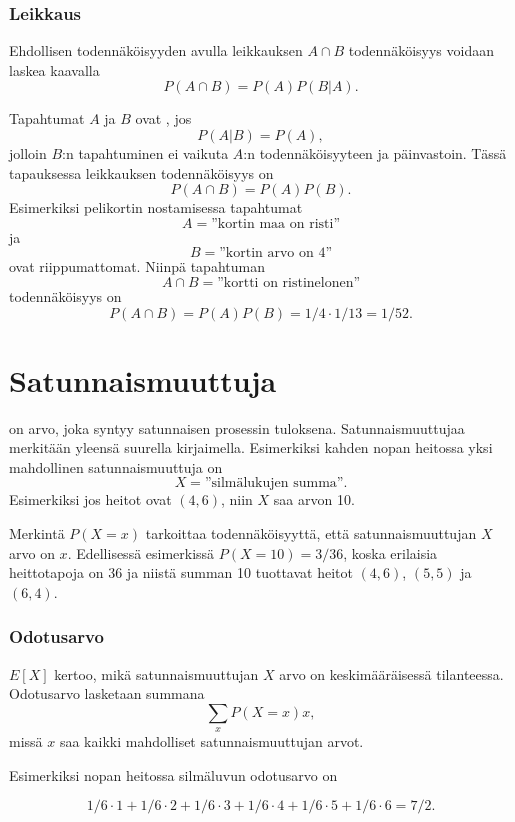 \subsubsection{Leikkaus}


Ehdollisen todennäköisyyden avulla
leikkauksen $A \cap B$ todennäköisyys
voidaan laskea kaavalla
\[P(A \cap B)=P(A)P(B|A).\]

Tapahtumat $A$ ja $B$ ovat , jos
\[P(A|B)=P(A),\]
jolloin $B$:n tapahtuminen ei vaikuta $A$:n
todennäköisyyteen ja päinvastoin.
Tässä tapauksessa leikkauksen
todennäköisyys on
\[P(A \cap B)=P(A)P(B).\]
Esimerkiksi pelikortin nostamisessa
tapahtumat
\[A = \textrm{''kortin maa on risti''}\]
ja
\[B = \textrm{''kortin arvo on 4''}\]
ovat riippumattomat.
Niinpä tapahtuman
\[A \cap B = \textrm{''kortti on ristinelonen''}\]
todennäköisyys on
\[P(A \cap B)=P(A)P(B)=1/4 \cdot 1/13 = 1/52.\]

\section{Satunnaismuuttuja}


 on arvo, joka syntyy satunnaisen
prosessin tuloksena.
Satunnaismuuttujaa merkitään yleensä
suurella kirjaimella.
Esimerkiksi kahden nopan heitossa yksi mahdollinen
satunnaismuuttuja on
\[X=\textrm{''silmälukujen summa''}.\]
Esimerkiksi jos heitot ovat $(4,6)$,
niin $X$ saa arvon 10.

Merkintä $P(X=x)$ tarkoittaa todennäköisyyttä,
että satunnaismuuttujan $X$ arvo on $x$.
Edellisessä esimerkissä $P(X=10)=3/36$,
koska erilaisia heittotapoja on 36
ja niistä summan 10 tuottavat heitot
$(4,6)$, $(5,5)$ ja $(6,4)$.

\subsubsection{Odotusarvo}


 $E[X]$ kertoo, mikä satunnaismuuttujan $X$
arvo on keskimääräisessä tilanteessa.
Odotusarvo lasketaan summana
\[\sum_x P(X=x)x,\]
missä $x$ saa kaikki mahdolliset satunnaismuuttujan arvot.

Esimerkiksi nopan heitossa silmäluvun odotusarvo on

\[1/6 \cdot 1 + 1/6 \cdot 2 + 1/6 \cdot 3 + 1/6 \cdot 4 + 1/6 \cdot 5 + 1/6 \cdot 6 = 7/2.\]

